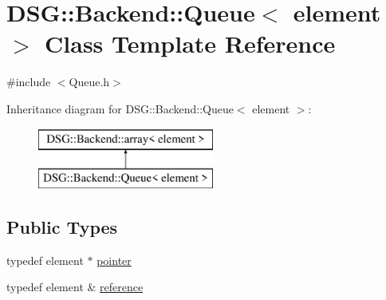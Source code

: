 \hypertarget{classDSG_1_1Backend_1_1Queue}{\section{D\+S\+G\+:\+:Backend\+:\+:Queue$<$ element $>$ Class Template Reference}
\label{classDSG_1_1Backend_1_1Queue}
}


{\ttfamily \#include $<$Queue.\+h$>$}

Inheritance diagram for D\+S\+G\+:\+:Backend\+:\+:Queue$<$ element $>$\+:\begin{figure}[H]
\begin{center}
\leavevmode
\includegraphics[height=2.000000cm]{classDSG_1_1Backend_1_1Queue}
\end{center}
\end{figure}
\subsection*{Public Types}
\begin{DoxyCompactItemize}
\item 
typedef element $\ast$ \hyperlink{classDSG_1_1Backend_1_1array_abfd0db2267892f4d2f397638faf85ca3}{pointer}
\item 
typedef element \& \hyperlink{classDSG_1_1Backend_1_1array_a8af2a20d445daee75e9e6b122498e0a6}{reference}
\end{DoxyCompactItemize}
